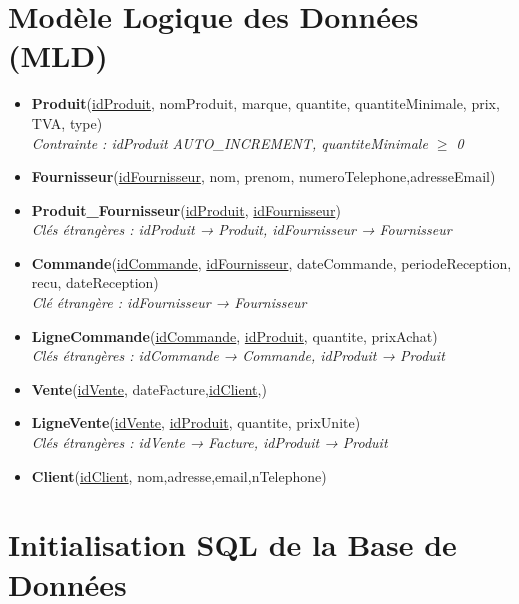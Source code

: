 \documentclass[12pt]{article}
\begin{document}
\section{Modèle Logique des Données (MLD)}

\begin{itemize}[label=--]
  \item \textbf{Produit}(\underline{idProduit}, nomProduit, marque, quantite, quantiteMinimale, prix, TVA, type)\\
    \textit{Contrainte : idProduit AUTO\_INCREMENT, quantiteMinimale $\geq$ 0}
  \item \textbf{Fournisseur}(\underline{idFournisseur}, nom, prenom, numeroTelephone,adresseEmail)
  \item \textbf{Produit\_Fournisseur}(\underline{idProduit}, \underline{idFournisseur})\\
    \textit{Clés étrangères : idProduit → Produit, idFournisseur → Fournisseur}
  \item \textbf{Commande}(\underline{idCommande}, \underline{idFournisseur}, dateCommande, periodeReception, recu, dateReception)\\
    \textit{Clé étrangère : idFournisseur → Fournisseur}
  \item \textbf{LigneCommande}(\underline{idCommande}, \underline{idProduit}, quantite, prixAchat)\\
    \textit{Clés étrangères : idCommande → Commande, idProduit → Produit}
  \item \textbf{Vente}(\underline{idVente}, dateFacture,\underline{idClient},)
  \item \textbf{LigneVente}(\underline{idVente}, \underline{idProduit}, quantite, prixUnite)\\
    \textit{Clés étrangères : idVente → Facture, idProduit → Produit}
 \item \textbf{Client}(\underline{idClient}, nom,adresse,email,nTelephone)
\end{itemize}
\section{Initialisation SQL de la Base de Données}
\end{document}
